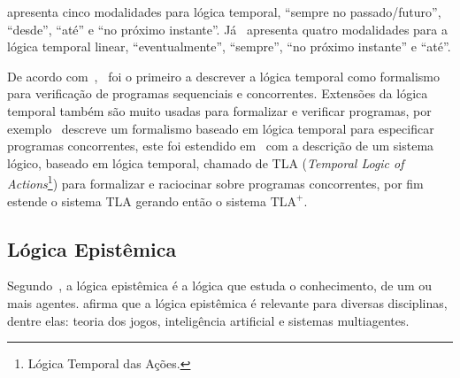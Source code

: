              apresenta cinco modalidades para lógica temporal, ``sempre no passado/futuro'', ``desde'', ``até'' e ``no próximo instante''.
            Já~ apresenta quatro modalidades para a lógica temporal linear, ``eventualmente'', ``sempre'', ``no próximo instante'' e ``até''.



            De acordo com~,~ foi o primeiro a descrever a lógica temporal como formalismo para
            verificação de programas sequenciais e concorrentes. %
            Extensões da lógica temporal também são muito usadas para formalizar e verificar programas, por exemplo~ descreve um formalismo
            baseado em lógica temporal para especificar programas concorrentes, este foi estendido em~ com a descrição de um sistema lógico, baseado em lógica temporal,
            chamado de TLA (\textit{Temporal Logic of Actions}\footnote{Lógica Temporal das Ações.}) para formalizar e raciocinar sobre programas concorrentes,
            por fim~ estende o sistema TLA gerando então o sistema \(\mathrm{TLA}^{+}\).

        \subsection{Lógica Epistêmica}
            \label{subsec:LogicaEpistemica}
            Segundo~, a lógica epistêmica é a lógica que estuda o conhecimento, de um ou mais agentes.
             afirma que a lógica epistêmica é relevante para diversas disciplinas, dentre elas: teoria dos jogos, inteligência artificial e sistemas
            multiagentes.

